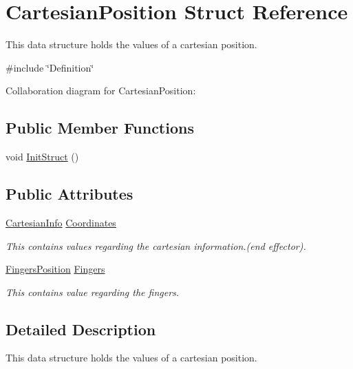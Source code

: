 \hypertarget{struct_cartesian_position}{}\section{Cartesian\+Position Struct Reference}
\label{struct_cartesian_position}


This data structure holds the values of a cartesian position.  




{\ttfamily \#include \char`\"{}Definition\char`\"{}}



Collaboration diagram for Cartesian\+Position\+:
\subsection*{Public Member Functions}
\begin{DoxyCompactItemize}
\item 
void \hyperlink{struct_cartesian_position_a555e4355ff9b88f0088b3ffcfc56af96}{Init\+Struct} ()
\end{DoxyCompactItemize}
\subsection*{Public Attributes}
\begin{DoxyCompactItemize}
\item 
\hyperlink{struct_cartesian_info}{Cartesian\+Info} \hyperlink{struct_cartesian_position_aa1e120e383c650f4c4bf88ba8c780ab1}{Coordinates}
\begin{DoxyCompactList}\small\item\em This contains values regarding the cartesian information.(end effector). \end{DoxyCompactList}\item 
\hyperlink{struct_fingers_position}{Fingers\+Position} \hyperlink{struct_cartesian_position_ad0d8710c54bb2f63dfc98d809eaeb3a4}{Fingers}
\begin{DoxyCompactList}\small\item\em This contains value regarding the fingers. \end{DoxyCompactList}\end{DoxyCompactItemize}


\subsection{Detailed Description}
This data structure holds the values of a cartesian position. 

